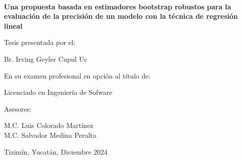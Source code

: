 \documentclass[12pt]{article}
\begin{document}
	\hskip -0.9cm
	\begin{minipage}[c][1\totalheight][s]{1cm}
		\begin{center}
			\hskip2pt\vrule width3.5pt height19.5cm\hskip1mm
			\vrule width0.5pt height19.5cm\\[10pt]
		\end{center}
	\end{minipage}\hspace{0.5cm}\begin{minipage}[c][1\totalheight][s]{14cm}
		\begin{center}
			\vspace{1.5cm}
			
			{\selectfont\Large\textbf{Una propuesta basada en estimadores bootstrap robustos para la evaluación de la precisión de un modelo con la técnica de regresión lineal}}
			
			\vspace{1cm}
			{{\selectfont\large Tesis presentada por el:}}\\
			
			\vspace{0.5cm}
			
			{{\selectfont\large Br. Irving Geyler Cupul Uc}}\\
			
			\vspace{1.5cm}
			
			{\selectfont\large En su examen profesional en opción al título de:}
			
			\vspace{0.5cm}
			
			{\selectfont\large Licenciado en Ingeniería de Sofware}
			
			\vspace{1.2cm}
			
			{\selectfont\large Asesores:}
			
			\vspace{0.5cm}
			
			{\selectfont\large M.C. Luis Colorado Martínez\\M.C. Salvador Medina Peralta}
			
			\vspace{4cm}
			{{\selectfont Tizimín, Yucatán, Diciembre 2024}}
		\end{center}
	\end{minipage}
	\newpage
	
	
	
	\newpage
	
	\newpage
	
	\newpage
	
	\newpage
	
	\newpage
	
	\newpage
	
	\newpage
	
	\newpage
	
\end{document}

